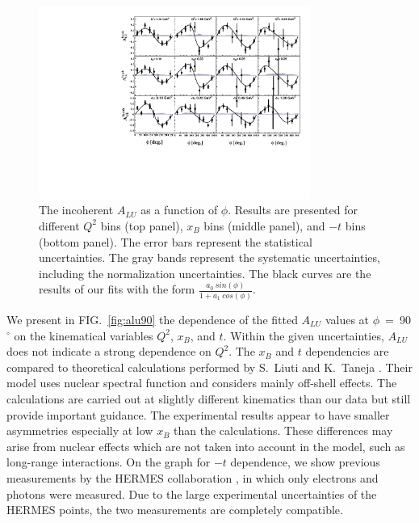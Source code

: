 \documentclass[twocolumn,nofootinbib,showpacs,prl,superscriptaddress,secnumarabic,amssymb,nobibnotes,aps,floatfix]{revtex4}
\begin{document}
\begin{figure}[tb]
\includegraphics[width=8.9cm]{figs/incoherent_ALU_phi.pdf}
\caption{The incoherent $A_{LU}$ as a function of $\phi$. Results are presented
   for different $Q^{2}$ bins (top panel), $x_{B}$ bins (middle panel), and 
   $-t$ bins (bottom panel). The error bars represent the statistical 
   uncertainties. The gray bands represent the systematic uncertainties, 
   including the normalization uncertainties. The black curves are the results 
   of our fits with the form $\frac{a_{0}~sin(\phi)}{1+ a_{1}~cos(\phi)}$.}
\label{fig:alu}
\end{figure}


We present in FIG.~\ref{fig:alu90} the dependence of the fitted $A_{LU}$ 
values at $\phi$~=~90$^{\circ}$ on the kinematical variables $Q^2$, $x_{B}$, 
and $t$. Within the given uncertainties, $A_{LU}$ does not indicate a strong 
dependence on $Q^2$. The $x_{B}$ and $t$ dependencies are compared to 
theoretical calculations performed by S.~Liuti and K.~Taneja 
\cite{simonetta_2}. Their model uses nuclear spectral function and 
considers mainly off-shell effects. The calculations are carried out at slightly 
different kinematics than our data but still provide important guidance. The 
experimental results appear to have smaller asymmetries especially at low 
$x_{B}$ than the calculations. These differences may arise from nuclear 
effects which are not taken into account in the model, such as long-range 
interactions. On the graph for $-t$ dependence, we show previous measurements 
by the HERMES collaboration \cite{Airapetian:2009cga}, in which only electrons
and photons were measured. Due to the large experimental uncertainties of the HERMES 
points, the two measurements are completely compatible. 
\end{document}
